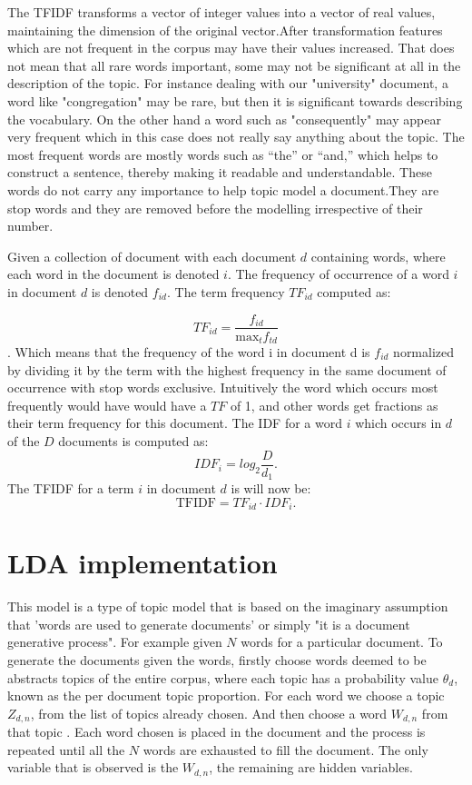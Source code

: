 \begin{flushleft}
The TFIDF transforms a vector of integer values into a vector of real values, maintaining the dimension of the original vector.After transformation  features which are not frequent in the corpus may have their values increased. That does not mean that  all rare words important, some may not be significant at all in the description of the topic.
For instance dealing with our "university" document, a word like "congregation" may be rare, but then it is significant towards describing the vocabulary. On the other hand a word such as "consequently" may appear very frequent which in this case does not really say anything about the topic. The most frequent words are
mostly words such as “the” or “and,” which helps to construct a sentence, thereby making it readable and understandable. These words do not carry any importance to help topic model a document.They are stop words and they are removed before the modelling irrespective of their number.
\end{flushleft}
 Given a collection of document with each document $d$ containing words, where each word in the document is denoted $i$. The frequency of occurrence of a word $i$ in document $d$ is denoted $f_{id}$. The term frequency $TF_{id}$ computed as:
 
$$TF_{id}=\frac{f_{id}}{\text{max}_tf_{td}}$$.
Which means that the  frequency of the word i in document d is $f_{id }$ normalized by dividing
it by the term with the highest frequency in the same document of occurrence with stop words exclusive.
Intuitively the word which occurs most frequently would have  would have a $TF$ of 1,
and other words get fractions as their term frequency for this document.
The IDF for a word $i$ which occurs in $d$ of the $D$ documents is computed as:
$$IDF_i=log_2 \frac{D}{d_1}\text{.}$$
The TFIDF for a term $i$ in document $d$ is will now be:
$$\text{TFIDF}=TF_{id}\cdot IDF_i \text{.}$$
\section{LDA implementation}
This model is a type of topic model that is based on the imaginary  assumption that 'words are used to generate documents' or simply "it is a document generative process".
For example given $N$ words for a particular document. To generate the documents given the words, firstly choose words deemed to be abstracts topics of  the entire corpus, where each topic has a probability  value $ \theta_d $, known as the per document topic proportion. For each word  we choose a topic $ Z_{d,n} $, from the list of topics already chosen. And then choose a word $ W_{d,n} $ from that topic . Each word chosen is placed in the document and the process is repeated until all the $ N $ words are exhausted to fill the document. The only variable that is observed is the $ W_{d,n} $, the remaining are hidden variables.


